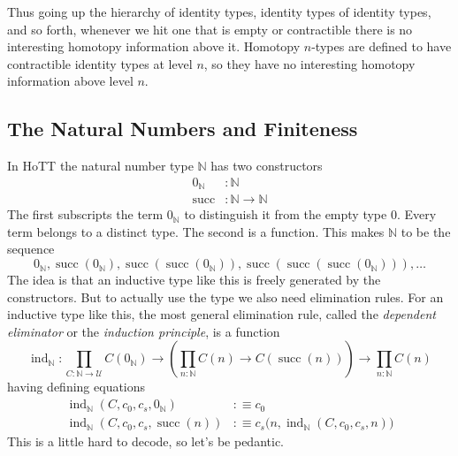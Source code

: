 \documentclass[11pt]{article}
\DeclareMathOperator{\successor}{succ}
\DeclareMathOperator{\inductor}{ind}
\newcommand{\nats}{\mathbb{N}}
\newcommand{\universe}{\mathcal{U}}
\begin{document}
Thus going up the hierarchy of identity types, identity types of identity
types, and so forth, whenever we hit one that is empty or contractible there
is no interesting homotopy information above it.
Homotopy $n$-types are defined to have contractible identity types at level
$n$, so they have no interesting homotopy information above level $n$.

\subsection{The Natural Numbers and Finiteness}
\label{sec:nats}

In HoTT the natural number type $\nats$ has two constructors
\begin{align*}
   0_\nats & : \nats
   \\
   \successor & : \nats \to \nats
\end{align*}
The first subscripts the term $0_\nats$ to distinguish it from the empty
type 0.  Every term belongs to a distinct type.
The second is a function.  This makes $\nats$ to be the sequence
$$
   0_\nats,
   \successor(0_\nats),
   \successor(\successor(0_\nats)),
   \successor(\successor(\successor(0_\nats))),
   \ldots
$$
The idea is that an inductive type like this is freely generated by
the constructors.  But to actually use the type we also need elimination
rules.  For an inductive type like this, the most general elimination rule,
called the \emph{dependent eliminator} or the \emph{induction principle},
is a function
\begin{equation}
\label{eq:natural-numbers-induction}
   \inductor_\nats : \prod_{C : \nats \to \universe}
   C(0_\nats) \to \left( \prod_{n : \nats} C(n) \to C(\successor(n)) \right)
   \to \prod_{n : \nats} C(n)
\end{equation}
having defining equations
\begin{subequations}
\begin{align}
   \inductor_\nats(C, c_0, c_s, 0_\nats) & :\equiv c_0
   \label{eq:nats-induction-base}
   \\
   \inductor_\nats(C, c_0, c_s, \successor(n)) & :\equiv
   c_s\bigl(n, \inductor_\nats(C, c_0, c_s, n) \bigr)
   \label{eq:nats-induction-succ}
\end{align}
\end{subequations}
This is a little hard to decode, so let's be pedantic.
\end{document}
